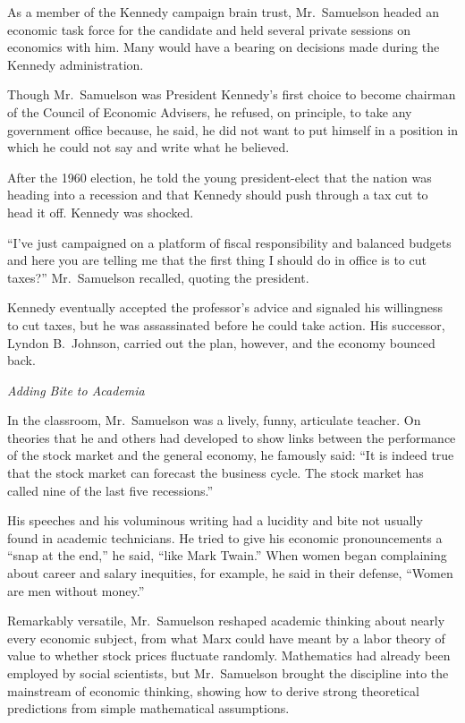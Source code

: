 ﻿\documentclass[12pt]{article}
\begin{document}
As a member of the Kennedy campaign brain trust, Mr.~Samuelson headed an economic task force for the
candidate and held several private sessions on economics with him. Many would have a bearing on
decisions made during the Kennedy administration.

Though Mr.~Samuelson was President Kennedy's first choice to become chairman of the Council of
Economic Advisers, he refused, on principle, to take any government office because, he said, he did
not want to put himself in a position in which he could not say and write what he believed.

After the 1960 election, he told the young president-elect that the nation was heading into a
recession and that Kennedy should push through a tax cut to head it off. Kennedy was shocked.

``I've just campaigned on a platform of fiscal responsibility and balanced budgets and here you are
telling me that the first thing I should do in office is to cut taxes?'' Mr.~Samuelson recalled,
quoting the president.

Kennedy eventually accepted the professor's advice and signaled his willingness to cut taxes, but he
was assassinated before he could take action. His successor, Lyndon B.~Johnson, carried out the
plan, however, and the economy bounced back.

\emph{Adding Bite to Academia}

In the classroom, Mr.~Samuelson was a lively, funny, articulate teacher. On theories that he and
others had developed to show links between the performance of the stock market and the general
economy, he famously said: ``It is indeed true that the stock market can forecast the business
cycle. The stock market has called nine of the last five recessions.''

His speeches and his voluminous writing had a lucidity and bite not usually found in academic
technicians. He tried to give his economic pronouncements a ``snap at the end,'' he said, ``like
Mark Twain.'' When women began complaining about career and salary inequities, for example, he said
in their defense, ``Women are men without money.''

Remarkably versatile, Mr.~Samuelson reshaped academic thinking about nearly every economic subject,
from what Marx could have meant by a labor theory of value to whether stock prices fluctuate
randomly. Mathematics had already been employed by social scientists, but Mr.~Samuelson brought the
discipline into the mainstream of economic thinking, showing how to derive strong theoretical
predictions from simple mathematical assumptions.
\end{document}
